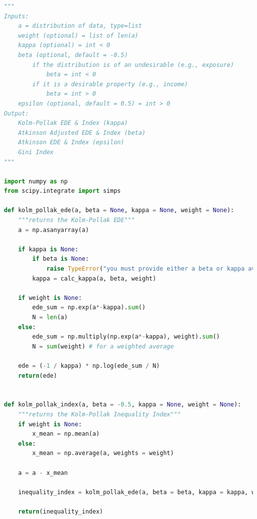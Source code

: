 \documentclass[final,3p,times,onecolumn,sort&compress]{elsarticle}
\begin{document}
\begin{lstlisting}[language=Python]
"""
Inputs:
    a = distribution of data, type=list
    weight (optional) = list of len(a)
    kappa (optional) = int < 0
    beta (optional, default = -0.5)
        if the distribution is of an undesirable (e.g., exposure)
            beta = int < 0 
        if it is a desirable property (e.g., income) 
            beta = int > 0 
    epsilon (optional, default = 0.5) = int > 0
Output:
    Kolm-Pollak EDE & Index (kappa)
    Atkinson Adjusted EDE & Index (beta)
    Atkinson EDE & Index (epsilon)
    Gini Index
"""

import numpy as np
from scipy.integrate import simps

def kolm_pollak_ede(a, beta = None, kappa = None, weight = None):
    """returns the Kolm-Pollak EDE"""
    a = np.asanyarray(a)

    if kappa is None:
        if beta is None:
            raise TypeError("you must provide either a beta or kappa aversion parameter")
        kappa = calc_kappa(a, beta, weight)

    if weight is None:
        ede_sum = np.exp(a*-kappa).sum()
        N = len(a)
    else:
        ede_sum = np.multiply(np.exp(a*-kappa), weight).sum()
        N = sum(weight) # for a weighted average

    ede = (-1 / kappa) * np.log(ede_sum / N)
    return(ede)


def kolm_pollak_index(a, beta = -0.5, kappa = None, weight = None):
    """returns the Kolm-Pollak Inequality Index"""
    if weight is None:
        x_mean = np.mean(a)
    else:
        x_mean = np.average(a, weights = weight)

    a = a - x_mean

    inequality_index = kolm_pollak_ede(a, beta = beta, kappa = kappa, weight = weight)

    return(inequality_index)

\end{lstlisting}
\end{document}
